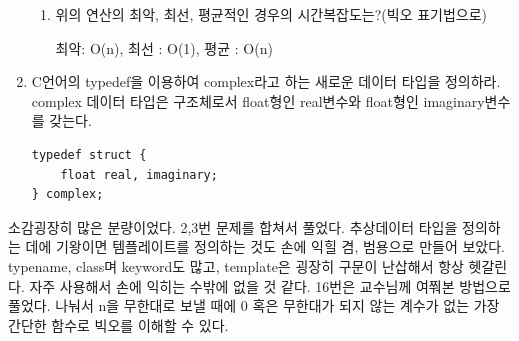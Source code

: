 \documentclass[11pt,a4paper]{article}
\begin{document}
\begin{enumerate}
\begin{enumerate}
\item 위의 연산의 최악, 최선, 평균적인 경우의 시간복잡도는?(빅오 표기법으로)

최악: O(n), 최선 : O(1), 평균 : O(n)
\end{enumerate} 
\item C언어의 typedef을 이용하여 complex라고 하는 새로운 데이터 타입을 정의하라. complex 데이터 타입은 구조체로서 float형인 real변수와 float형인 imaginary변수를 갖는다.
\begin{lstlisting}
typedef struct {
	float real, imaginary;
} complex;
\end{lstlisting}


\end{enumerate}
\vspace{2cm}
{\Huge 소감}굉장히 많은 분량이었다. 2,3번 문제를 합쳐서 풀었다. 추상데이터 타입을 정의하는 데에 기왕이면 템플레이트를 정의하는 것도 손에 익힐 겸, 범용으로 만들어 보았다. typename, class며 keyword도 많고, template은 굉장히 구문이 난삽해서 항상 헷갈린다. 자주 사용해서 손에 익히는 수밖에 없을 것 같다. 16번은 교수님께 여쭤본 방법으로 풀었다. 나눠서 n을 무한대로 보낼 때에 0 혹은 무한대가 되지 않는 계수가 없는 가장 간단한 함수로 빅오를 이해할 수 있다.
\end{document}

